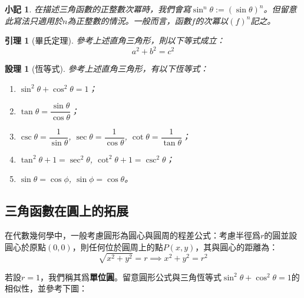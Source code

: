 \documentclass[12pt]{article}
\newtheorem*{lemma}{引理}
\newtheorem*{proposition}{設理}
\newtheorem*{remark}{小記}
\begin{document}
    \begin{remark}
        在描述三角函數的正整數次冪時，我們會寫$\sin^n{\theta}:=(\sin{\theta})^n$。但留意此寫法只適用於$n$為正整數的情況。一般而言，函數$f$的次冪以$(f)^n$記之。
    \end{remark}

    \begin{lemma}[畢氏定理]
        參考上述直角三角形，則以下等式成立：$$a^2+b^2=c^2$$
    \end{lemma}

    \begin{proposition}[恆等式]
        參考上述直角三角形，有以下恆等式：\begin{enumerate}
            \item $\sin^2{\theta}+\cos^2{\theta}=1$；
            \item $\tan{\theta}=\dfrac{\sin{\theta}}{\cos{\theta}}$；
            \item $\csc{\theta}=\dfrac{1}{\sin{\theta}}$, $\sec{\theta}=\dfrac{1}{\cos{\theta}}$, $\cot{\theta}=\dfrac{1}{\tan{\theta}}$；
            \item $\tan^2{\theta}+1=\sec^2{\theta}$, $\cot^2{\theta}+1=\csc^2{\theta}$；
            \item $\sin{\theta}=\cos{\phi}$, $\sin{\phi}=\cos{\theta}$。
        \end{enumerate}
    \end{proposition}

    \subsection*{三角函數在圓上的拓展}

    在代數幾何學中，一般考慮圓形為圓心與圓周的程差公式：考慮半徑爲$r$的圓並設圓心於原點$(0,0)$，則任何位於圓周上的點$P(x,y)$，其與圓心的距離為：$$\sqrt{x^2+y^2}=r\implies x^2+y^2=r^2$$

    若設$r=1$，我們稱其爲\textbf{單位圓}。留意圓形公式與三角恆等式$\sin^2{\theta}+\cos^2{\theta}=1$的相似性，並參考下圖：
\end{document}
